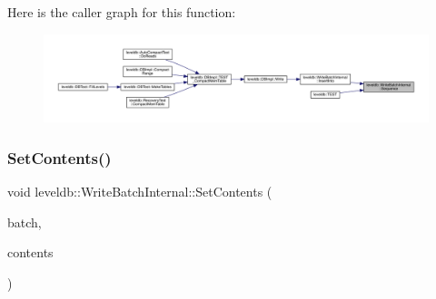 Here is the caller graph for this function\+:
\nopagebreak
\begin{figure}[H]
\begin{center}
\leavevmode
\includegraphics[width=350pt]{classleveldb_1_1_write_batch_internal_af657c82bd9378b78c35a3a7429f945d4_icgraph}
\end{center}
\end{figure}
\mbox{\label{classleveldb_1_1_write_batch_internal_aa07e75250aed00d06f2e4df85ee926b9}} 
\subsubsection{\texorpdfstring{SetContents()}{SetContents()}}
{\footnotesize\ttfamily void leveldb\+::\+Write\+Batch\+Internal\+::\+Set\+Contents (\begin{DoxyParamCaption}\item[{\mbox{\hyperlink{classleveldb_1_1_write_batch}{Write\+Batch}} $\ast$}]{batch,  }\item[{const \mbox{\hyperlink{classleveldb_1_1_slice}{Slice}} \&}]{contents }\end{DoxyParamCaption})\hspace{0.3cm}{\ttfamily [static]}}

